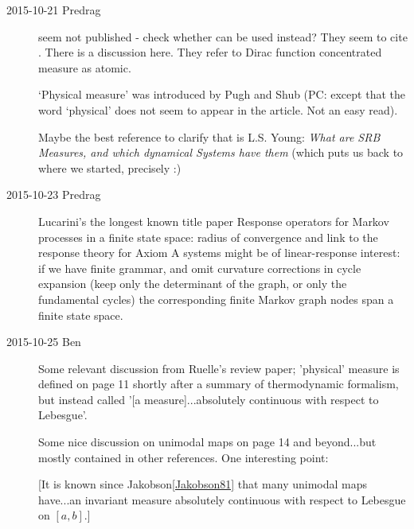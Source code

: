 \begin{description}

\item[2015-10-21 Predrag]
 seem not published - check whether
 can be used instead? They seem to cite
. There is a discussion
{here}. They refer to Dirac function concentrated measure  as atomic.

`Physical measure' was introduced by Pugh and Shub (PC:
except that the word `physical' does not seem to appear in the article.
Not an easy read).

Maybe the best reference to clarify that is L.S. Young:
\emph{What are SRB Measures, and which dynamical Systems have them}
(which puts us back to where we started, precisely :)

\item[2015-10-23 Predrag]
Lucarini's the longest known title paper
{\rf Response operators for {Markov} processes in a finite state
             space: radius of convergence and link to
             the response theory for {Axiom A} systems}
might be of linear-response interest: if we have finite grammar, and omit
curvature corrections in cycle expansion (keep only the determinant of
the graph, or only the fundamental cycles) the corresponding finite
Markov graph nodes span a finite state space.

\item[2015-10-25 Ben]
Some relevant discussion from Ruelle's review paper; 'physical' 
measure is defined on page 11 shortly after a summary of 
thermodynamic formalism, but instead called 
'[a measure]...absolutely continuous with respect to Lebesgue'. 

Some nice discussion on unimodal maps on page 14 and beyond...but mostly contained 
in other references. One interesting point:

[It is known since Jakobson\ref{Jakobson81} that many unimodal maps have...an invariant measure 
absolutely continuous with respect to Lebesgue on $[a,b]$.] 


\end{description}
